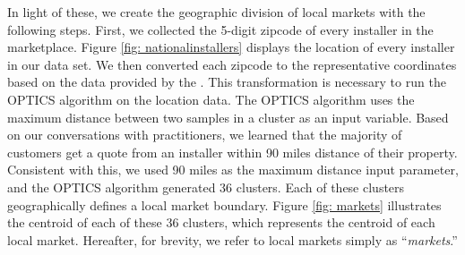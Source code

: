 \documentclass[msom,blindrev]{informs3}
\begin{document}
	In light of these, we create the geographic division of local markets with the following steps. First, we collected the 5-digit zipcode of
	every installer in the marketplace. Figure \ref{fig: nationalinstallers} displays the location of every installer in our data set. We then converted each zipcode  to the representative coordinates based on the data provided by the \citet{us_census_bureau_2019}. This transformation is necessary to run the OPTICS algorithm on the location data. The OPTICS algorithm uses the maximum distance between two samples in a cluster as an input variable. Based on our conversations with practitioners, we learned that the majority of customers get a quote from an installer within 90 miles distance of their property. Consistent with this, we used 90 miles as the maximum distance input parameter, and the OPTICS algorithm generated 36 clusters. Each of these clusters geographically defines a local market boundary. Figure \ref{fig: markets} illustrates the centroid of each of these 36 clusters, which represents the centroid of each local market. Hereafter, for brevity, we refer to local markets simply as ``\emph{markets}.''
	
	
	
	
	
\end{document}
